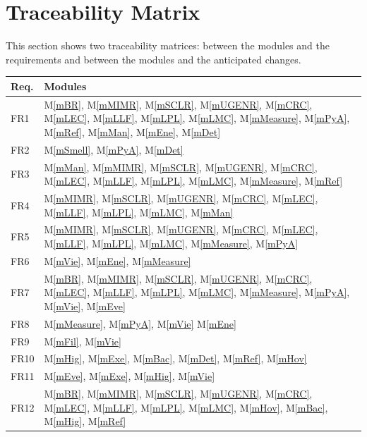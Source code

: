 \documentclass[12pt, titlepage]{article}
\newcommand{\mref}[1]{M\ref{#1}}
\begin{document}
\section{Traceability Matrix} \label{SecTM}

This section shows two traceability matrices: between the modules and the
requirements and between the modules and the anticipated changes.

\begin{table}[H]
  \centering
  \begin{tabular}{p{} p{}}
    \toprule
    \textbf{Req.} & \textbf{Modules}\\
    \midrule
    FR1 & \mref{mBR}, \mref{mMIMR}, \mref{mSCLR}, \mref{mUGENR}, \mref{mCRC}, \mref{mLEC}, \mref{mLLF}, \mref{mLPL}, \mref{mLMC}, \mref{mMeasure}, \mref{mPyA}, \mref{mRef}, \mref{mMan}, \mref{mEne}, \mref{mDet} \\
    FR2 & \mref{mSmell}, \mref{mPyA}, \mref{mDet} \\
    FR3 & \mref{mMan},  \mref{mMIMR}, \mref{mSCLR}, \mref{mUGENR}, \mref{mCRC}, \mref{mLEC}, \mref{mLLF}, \mref{mLPL}, \mref{mLMC}, \mref{mMeasure}, \mref{mRef}\\
    FR4 & \mref{mMIMR}, \mref{mSCLR}, \mref{mUGENR}, \mref{mCRC}, \mref{mLEC}, \mref{mLLF}, \mref{mLPL}, \mref{mLMC}, \mref{mMan} \\
    FR5 & \mref{mMIMR}, \mref{mSCLR}, \mref{mUGENR}, \mref{mCRC}, \mref{mLEC}, \mref{mLLF}, \mref{mLPL}, \mref{mLMC}, \mref{mMeasure}, \mref{mPyA}\\
    FR6 & \mref{mVie}, \mref{mEne}, \mref{mMeasure} \\
    FR7 & \mref{mBR}, \mref{mMIMR}, \mref{mSCLR}, \mref{mUGENR}, \mref{mCRC}, \mref{mLEC}, \mref{mLLF}, \mref{mLPL}, \mref{mLMC}, \mref{mMeasure}, \mref{mPyA}, \mref{mVie}, \mref{mEve}\\
    FR8 & \mref{mMeasure}, \mref{mPyA}, \mref{mVie} \mref{mEne} \\
    FR9 & \mref{mFil}, \mref{mVie}\\
    FR10 & \mref{mHig}, \mref{mExe}, \mref{mBac}, \mref{mDet}, \mref{mRef}, \mref{mHov} \\
    FR11 & \mref{mEve}, \mref{mExe}, \mref{mHig}, \mref{mVie} \\
    FR12 & \mref{mBR}, \mref{mMIMR}, \mref{mSCLR}, \mref{mUGENR}, \mref{mCRC}, \mref{mLEC}, \mref{mLLF}, \mref{mLPL}, \mref{mLMC}, \mref{mHov}, \mref{mBac}, \mref{mHig}, \mref{mRef} \\

\end{tabular}
\end{table}
\end{document}
